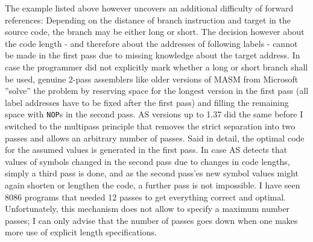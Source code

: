 \documentclass[12pt,twoside]{report}
\newcommand{\tty}[1]{{\tt #1}}
\begin{document}
The example listed above however uncovers an additional difficulty of
forward references: Depending on the distance of branch instruction
and target in the source code, the branch may be either long or
short.  The decision however about the code length - and therefore
about the addresses of following labels - cannot be made in the first
pass due to missing knowledge about the target address.  In case the
programmer did not explicitly mark whether a long or short branch
shall be used, genuine 2-pass assemblers like older versions of MASM
from Microsoft ''solve'' the problem by reserving space for the longest
version in the first pass (all label addresses have to be fixed after
the first pass) and filling the remaining space with \tty{NOP}s in the
second pass.  AS versions up to 1.37 did the same before I switched
to the multipass principle that removes the strict separation into
two passes and allows an arbitrary number of passes.  Said in detail,
the optimal code for the assumed values is generated in the first
pass.  In case AS detects that values of symbols changed in the second
pass due to changes in code lengths, simply a third pass is done, and
as the second pass'es new symbol values might again shorten or
lengthen the code, a further pass is not impossible.  I have seen
8086 programs that needed 12 passes to get everything correct and
optimal.  Unfortunately, this mechanism does not allow to specify a
maximum number passes; I can only advise that the number of passes
goes down when one makes more use of explicit length specifications.
\end{document}
